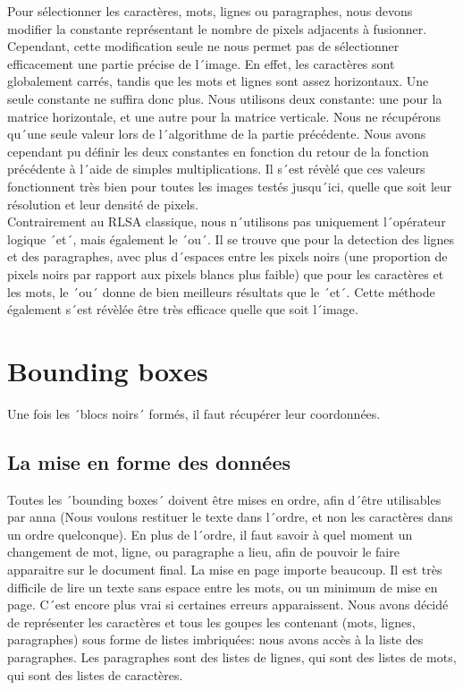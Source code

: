 Pour sélectionner les caractères, mots, lignes ou paragraphes, nous devons modifier la constante représentant le nombre de pixels adjacents à fusionner. Cependant, cette modification seule ne nous permet pas de sélectionner efficacement une partie précise de l´image. En effet, les caractères sont globalement carrés, tandis que les mots et lignes sont assez horizontaux. Une seule constante ne suffira donc plus. Nous utilisons deux constante: une pour la matrice horizontale, et une autre pour la matrice verticale. Nous ne récupérons qu´une seule valeur lors de l´algorithme de la partie précédente. Nous avons cependant pu définir les deux constantes en fonction du retour de la fonction précédente à l´aide de simples multiplications. Il s´est révèlé que ces valeurs fonctionnent très bien pour toutes les images testés jusqu´ici, quelle que soit leur résolution et leur densité de pixels.\\
Contrairement au RLSA classique, nous n´utilisons pas uniquement l´opérateur logique ´et´, mais également le ´ou´. Il se trouve que pour la detection des lignes et des paragraphes, avec plus d´espaces entre les pixels noirs (une proportion de pixels noirs par rapport aux pixels blancs plus faible) que pour les caractères et les mots, le ´ou´ donne de bien meilleurs résultats que le ´et´. Cette méthode également s´est révèlée être très efficace quelle que soit l´image.


\section{Bounding boxes}

Une fois les ´blocs noirs´ formés, il faut récupérer leur coordonnées.  


\subsection{La mise en forme des données}

Toutes les ´bounding boxes´ doivent être mises en ordre, afin d´être utilisables par anna (Nous voulons restituer le texte dans l´ordre, et non les caractères dans un ordre quelconque). En plus de l´ordre, il faut savoir à quel moment un changement de mot, ligne, ou paragraphe a lieu, afin de pouvoir le faire apparaitre sur le document final. La mise en page importe beaucoup. Il est très difficile de lire un texte sans espace entre les mots, ou un minimum de mise en page. C´est encore plus vrai si certaines erreurs apparaissent. Nous avons décidé de représenter les caractères et tous les goupes les contenant (mots, lignes, paragraphes) sous forme de listes imbriquées: nous avons accès à la liste des paragraphes. Les paragraphes sont des listes de lignes, qui sont des listes de mots, qui sont des listes de caractères.


